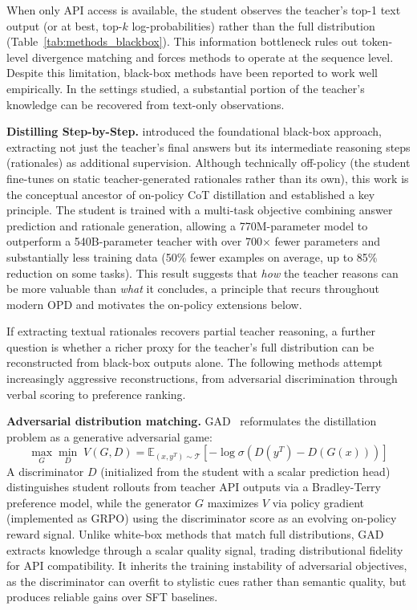 \documentclass{article} %
\newcommand{\E}{\mathbb{E}}
\begin{document}
When only API access is available, the student observes the teacher's top-1 text output (or at best, top-$k$ log-probabilities) rather than the full distribution (Table~\ref{tab:methods_blackbox}). This information bottleneck rules out token-level divergence matching and forces methods to operate at the sequence level. Despite this limitation, black-box methods have been reported to work well empirically. In the settings studied, a substantial portion of the teacher's knowledge can be recovered from text-only observations.

\textbf{Distilling Step-by-Step.} \citet{2305.02301} introduced the foundational black-box approach, extracting not just the teacher's final answers but its intermediate reasoning steps (rationales) as additional supervision. Although technically off-policy (the student fine-tunes on static teacher-generated rationales rather than its own), this work is the conceptual ancestor of on-policy CoT distillation and established a key principle. The student is trained with a multi-task objective combining answer prediction and rationale generation, allowing a 770M-parameter model to outperform a 540B-parameter teacher with over 700$\times$ fewer parameters and substantially less training data (50\% fewer examples on average, up to 85\% reduction on some tasks). This result suggests that \emph{how} the teacher reasons can be more valuable than \emph{what} it concludes, a principle that recurs throughout modern OPD and motivates the on-policy extensions below.

If extracting textual rationales recovers partial teacher reasoning, a further question is whether a richer proxy for the teacher's full distribution can be reconstructed from black-box outputs alone. The following methods attempt increasingly aggressive reconstructions, from adversarial discrimination through verbal scoring to preference ranking.

\textbf{Adversarial distribution matching.} GAD~\citep{2511.10643} reformulates the distillation problem as a generative adversarial game:
\begin{equation*}
    \max_{G} \min_{D}\; V(G, D) = \E_{(x, y^T) \sim \mathcal{T}} \left[ -\log \sigma\!\left( D(y^T) - D(G(x)) \right) \right]
\end{equation*}
A discriminator $D$ (initialized from the student with a scalar prediction head) distinguishes student rollouts from teacher API outputs via a Bradley-Terry preference model, while the generator $G$ maximizes $V$ via policy gradient (implemented as GRPO) using the discriminator score as an evolving on-policy reward signal. Unlike white-box methods that match full distributions, GAD extracts knowledge through a scalar quality signal, trading distributional fidelity for API compatibility. It inherits the training instability of adversarial objectives, as the discriminator can overfit to stylistic cues rather than semantic quality, but produces reliable gains over SFT baselines.
\end{document}
